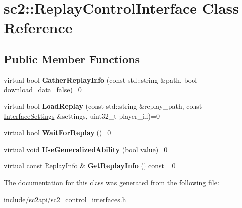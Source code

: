 \hypertarget{classsc2_1_1_replay_control_interface}{}\section{sc2\+:\+:Replay\+Control\+Interface Class Reference}
\label{classsc2_1_1_replay_control_interface}
\subsection*{Public Member Functions}
\begin{DoxyCompactItemize}
\item 
\mbox{\label{classsc2_1_1_replay_control_interface_ab02a7083b6ff67d68fb28e9d1e4f9c05}} 
virtual bool {\bfseries Gather\+Replay\+Info} (const std\+::string \&path, bool download\+\_\+data=false)=0
\item 
\mbox{\label{classsc2_1_1_replay_control_interface_ad3d5fe4c38b7e1fe1c09b2557374e904}} 
virtual bool {\bfseries Load\+Replay} (const std\+::string \&replay\+\_\+path, const \hyperlink{structsc2_1_1_interface_settings}{Interface\+Settings} \&settings, uint32\+\_\+t player\+\_\+id)=0
\item 
\mbox{\label{classsc2_1_1_replay_control_interface_af7bc6661abca0916236f3d00363b072e}} 
virtual bool {\bfseries Wait\+For\+Replay} ()=0
\item 
\mbox{\label{classsc2_1_1_replay_control_interface_a98a08ed5988ce3d515ef0d4a74e084ea}} 
virtual void {\bfseries Use\+Generalized\+Ability} (bool value)=0
\item 
\mbox{\label{classsc2_1_1_replay_control_interface_ae14304ff62e00d1f7f99f6d2876c9444}} 
virtual const \hyperlink{structsc2_1_1_replay_info}{Replay\+Info} \& {\bfseries Get\+Replay\+Info} () const =0
\end{DoxyCompactItemize}


The documentation for this class was generated from the following file\+:\begin{DoxyCompactItemize}
\item 
include/sc2api/sc2\+\_\+control\+\_\+interfaces.\+h\end{DoxyCompactItemize}
